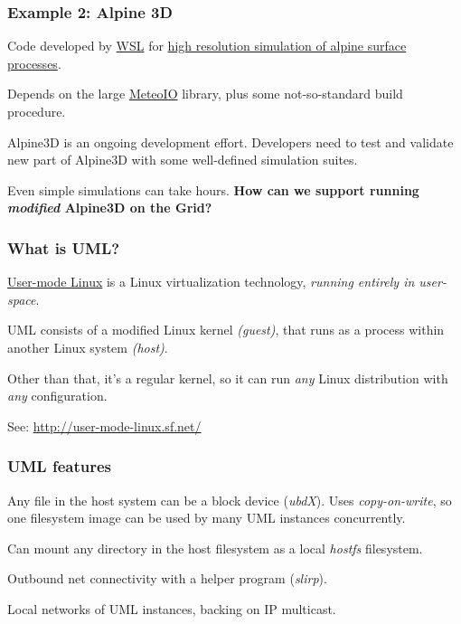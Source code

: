 \documentclass{beamer}
\begin{document}




\begin{frame}
  \frametitle{Example 2: Alpine 3D}
  \label{sec:5}
  
  Code developed by \href{http://www.wsl.ch/}{WSL} for
  \href{http://www.slf.ch/ueber/organisation/schnee_permafrost/projekte/Alpine/index_EN}
  {high resolution simulation of alpine surface processes}.

  \+
  Depends on the large
  \href{http://www.slideshare.net/GEOFRAMEcafe/meteo-io-introduction}{MeteoIO}
  library, plus some not-so-standard build procedure.
  
  \+
  Alpine3D is an ongoing development effort.  Developers need to test
  and validate new part of Alpine3D with some well-defined simulation
  suites.

  \+
  Even simple simulations can take hours. \textbf{How can we support
    running \emph{modified} Alpine3D on the Grid?}
\end{frame}


\begin{frame}
  \frametitle{What is UML?}
  \label{sec:6}
  \href{http://user-mode-linux.sf.net/}{User-mode Linux} is a Linux virtualization technology, 
  \emph{running entirely in user-space}.

  \+
  UML consists of a modified Linux kernel \emph{(guest)}, that runs as a
  process within another Linux system \emph{(host)}.
  
  \+
  Other than that, it's a regular kernel, so it can run \emph{any} Linux
  distribution with \emph{any} configuration.

  \+
  {See: \url{http://user-mode-linux.sf.net/}}
\end{frame}


\begin{frame}
  \frametitle{UML features}
  \label{sec:7}
  Any file in the host system can be a block device (\emph{ubdX}).
  Uses \emph{copy-on-write}, so one filesystem image can be used by many
  UML instances concurrently.

  \+
  Can mount any directory in the host filesystem as a local
  \emph{hostfs} filesystem.
  
  \+
  Outbound net connectivity with a helper program (\emph{slirp}).
  
  \+
  Local networks of UML instances, backing on IP multicast.
\end{frame}
\end{document}
